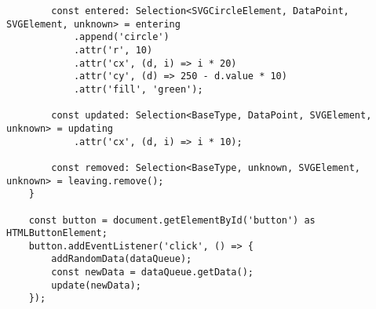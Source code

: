 \begin{lstlisting}
        const entered: Selection<SVGCircleElement, DataPoint, SVGElement, unknown> = entering
            .append('circle')
            .attr('r', 10)
            .attr('cx', (d, i) => i * 20)
            .attr('cy', (d) => 250 - d.value * 10)
            .attr('fill', 'green');
    
        const updated: Selection<BaseType, DataPoint, SVGElement, unknown> = updating
            .attr('cx', (d, i) => i * 10);
        
        const removed: Selection<BaseType, unknown, SVGElement, unknown> = leaving.remove();
    }
    
    const button = document.getElementById('button') as HTMLButtonElement;
    button.addEventListener('click', () => {
        addRandomData(dataQueue);
        const newData = dataQueue.getData();
        update(newData);
    }); 
\end{lstlisting}

